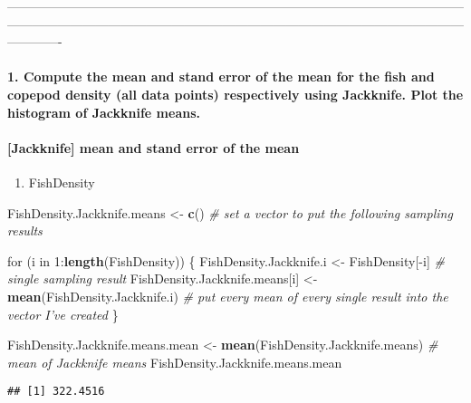\documentclass[]{article}
\newenvironment{Shaded}{\begin{snugshade}}{\end{snugshade}}
\newcommand{\KeywordTok}[1]{\textcolor[rgb]{0.13,0.29,0.53}{\textbf{{#1}}}}
\newcommand{\DecValTok}[1]{\textcolor[rgb]{0.00,0.00,0.81}{{#1}}}
\newcommand{\StringTok}[1]{\textcolor[rgb]{0.31,0.60,0.02}{{#1}}}
\newcommand{\CommentTok}[1]{\textcolor[rgb]{0.56,0.35,0.01}{\textit{{#1}}}}
\newcommand{\NormalTok}[1]{{#1}}
\providecommand{\tightlist}{%
  \setlength{\itemsep}{0pt}\setlength{\parskip}{0pt}}
\let\oldparagraph\paragraph
\renewcommand{\paragraph}[1]{\oldparagraph{#1}\mbox{}}
\begin{document}
-------------------------------------------------------------------------------------------------------------------------------------------------------------------------------------------------------------------------------------

\paragraph{1. Compute the mean and stand error of the mean for the fish
and copepod density (all data points) respectively using Jackknife. Plot
the histogram of Jackknife
means.}\label{compute-the-mean-and-stand-error-of-the-mean-for-the-fish-and-copepod-density-all-data-points-respectively-using-jackknife.-plot-the-histogram-of-jackknife-means.}

\paragraph{{[}Jackknife{]} mean and stand error of the
mean}\label{jackknife-mean-and-stand-error-of-the-mean}

\begin{enumerate}
\def\labelenumi{(\arabic{enumi})}
\tightlist
\item
  FishDensity
\end{enumerate}

\begin{Shaded}
\begin{Highlighting}[]
\NormalTok{FishDensity.Jackknife.means <-}\StringTok{ }\KeywordTok{c}\NormalTok{() }\CommentTok{# set a vector to put the following sampling results}

\NormalTok{for (i in }\DecValTok{1}\NormalTok{:}\KeywordTok{length}\NormalTok{(FishDensity)) \{}
\NormalTok{FishDensity.Jackknife.i <-}\StringTok{ }\NormalTok{FishDensity[-i] }\CommentTok{# single sampling result}
\NormalTok{FishDensity.Jackknife.means[i] <-}\StringTok{ }\KeywordTok{mean}\NormalTok{(FishDensity.Jackknife.i) }\CommentTok{# put every mean of every single result into the vector I've created}
\NormalTok{\}}

\NormalTok{FishDensity.Jackknife.means.mean <-}\StringTok{ }\KeywordTok{mean}\NormalTok{(FishDensity.Jackknife.means) }\CommentTok{# mean of Jackknife means}
\NormalTok{FishDensity.Jackknife.means.mean}
\end{Highlighting}
\end{Shaded}

\begin{verbatim}
## [1] 322.4516
\end{verbatim}
\end{document}
